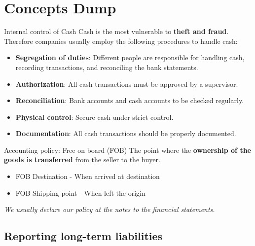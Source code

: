 \section{Concepts Dump}

\begin{theorem}
    {Internal control of Cash}
    Cash is the most vulnerable to \textbf{theft and fraud}. Therefore companies usually employ the following procedures to handle cash:
    \begin{itemize}
        \item \textbf{Segregation of duties}: Different people are responsible for handling cash, recording transactions, and reconciling the bank statements.
        \item \textbf{Authorization}: All cash transactions must be approved by a supervisor.
        \item \textbf{Reconciliation}: Bank accounts and cash accounts to be checked regularly.
        \item \textbf{Physical control}: Secure cash under strict control.
        \item \textbf{Documentation}: All cash transactions should be properly documented.
    \end{itemize}
\end{theorem}

\begin{theorem}
    {Accounting policy: Free on board (FOB)}
    The point where the \textbf{ownership of the goods is transferred} from the seller to the buyer.
    \begin{itemize}
        \item FOB Destination - When arrived at destination
        \item FOB Shipping point - When left the origin
    \end{itemize}
    \textit{We usually declare our policy at the notes to the financial statements.}
\end{theorem}

\subsection{Reporting long-term liabilities}

